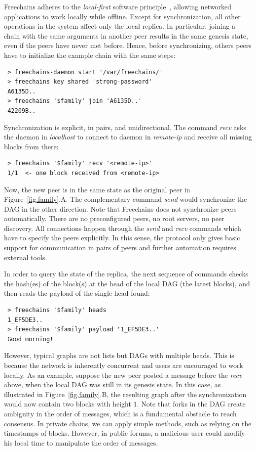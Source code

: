 \documentclass[10pt,journal,compsoc]{IEEEtran}
\newcommand{\FC}       {Freechains\xspace}
\begin{document}
\FC adheres to the \emph{local-first} software principle~\cite{p2p.local},
allowing networked applications to work locally while offline.
Except for synchronization, all other operations in the system affect only the
local replica.
In particular, joining a chain with the same arguments in another peer results
in the same genesis state, even if the peers have never met before.
Hence, before synchronizing, others peers have to initialize the example chain
with the same steps:

{\footnotesize
\begin{verbatim}
 > freechains-daemon start '/var/freechains/'
 > freechains key shared 'strong-password'
 A6135D..
 > freechains '$family' join 'A6135D..'
 42209B..
\end{verbatim}
}

Synchronization is explicit, in pairs, and unidirectional.
The command \emph{recv} asks the daemon in \emph{localhost} to connect to
daemon in \emph{remote-ip} and receive all missing blocks from there:

{\footnotesize
\begin{verbatim}
 > freechains '$family' recv '<remote-ip>'
 1/1  <- one block received from <remote-ip>
\end{verbatim}
}

Now, the new peer is in the same state as the original peer in
Figure~\ref{fig.family}.A.
The complementary command \emph{send} would synchronize the DAG in the other
direction.
Note that \FC does not synchronize peers automatically.
There are no preconfigured peers, no root servers, no peer discovery.
All connections happen through the \emph{send} and \emph{recv} commands which
have to specify the peers explicitly.
In this sense, the protocol only gives basic support for communication in pairs
of peers and further automation requires external tools.

In order to query the state of the replica, the next sequence of commands
checks the hash(es) of the block(s) at the head of the local DAG (the latest
blocks), and then reads the payload of the single head found:


{\footnotesize
\begin{verbatim}
 > freechains '$family' heads
 1_EF5DE3..
 > freechains '$family' payload '1_EF5DE3..'
 Good morning!
\end{verbatim}
}

However, typical graphs are not lists but DAGs with multiple heads.
This is because the network is inherently concurrent and users are encouraged
to work locally.
As an example, suppose the new peer posted a message before the \emph{recv}
above, when the local DAG was still in its genesis state.
In this case, as illustrated in Figure~\ref{fig.family}.B, the resulting graph
after the synchronization would now contain two blocks with height $1$.
%
Note that forks in the DAG create ambiguity in the order of messages, which is
a fundamental obstacle to reach consensus.
In private chains, we can apply simple methods, such as relying on the
timestamps of blocks.
However, in public forums, a malicious user could modify his local time to
manipulate the order of messages.
\end{document}
